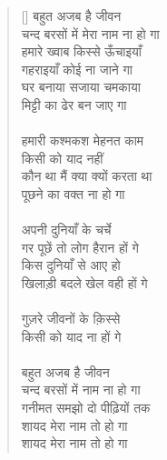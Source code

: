 \begin{verse}[\versewidth]\texthindi{
बहुत अजब है जीवन\\
चन्द बरसों में मेरा नाम ना हो गा\\
हमारे ख्वाब किस्से ऊँचाइयाँ\\
गहराइयाँ कोई ना जाने गा \\
घर बनाया सजाया चमकाया\\
मिट्टी का ढेर बन जाए गा\\
\\
हमारी कश्मकश मेहनत काम\\
किसी को याद नहीं\\
कौन था मैं क्या क्यों करता था\\
पूछने का वक्त ना हो गा\\
\\
अपनी दुनियाँ के चर्चे\\
गर पूछें तो लोग हैरान हों गे\\
किस दुनियाँ से आए हो\\
खिलाड़ी बदले खेल वही हों गे\\
\\
गुज़रे जीवनों के क़िस्से\\
किसी को याद ना हों गे\\
\\
बहुत अजब है जीवन\\
चन्द बरसों में नाम ना हो गा\\
गनीमत समझो दो पीढ़ियों तक\\
शायद मेरा नाम तो हो गा \\
शायद मेरा नाम तो हो गा
}\end{verse}

